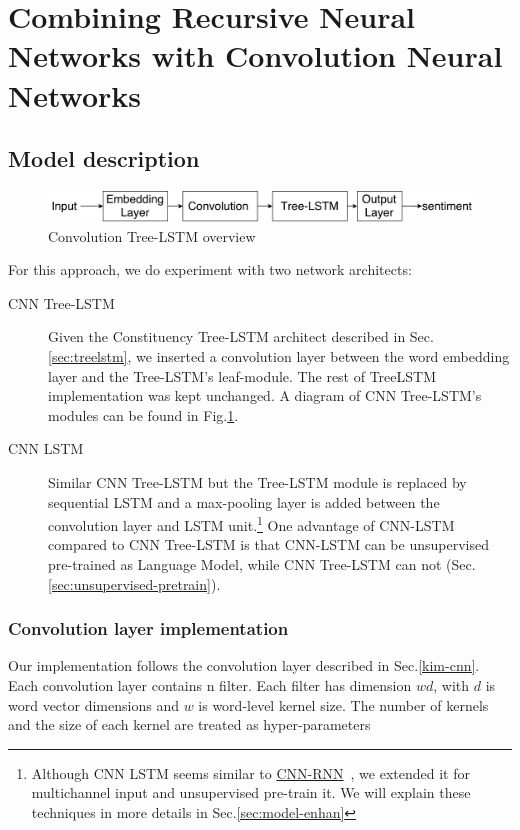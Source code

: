 \hypertarget{sec:CNNtree}{\section{Combining Recursive Neural Networks with Convolution Neural Networks}}\label{sec:CNNtree}
\subsection{Model description}
\begin{figure}[H]
    \centering
    \includegraphics[width=0.8\linewidth]{figure/convtreelstmsummary}
    \caption[Convolution Tree-LSTM overview]{Convolution Tree-LSTM overview}
    \label{fig:convtreelstmsummary}
\end{figure}
For this approach, we do experiment with two network architects:
\begin{description}
\item[CNN Tree-LSTM] Given the Constituency Tree-LSTM architect described in Sec.\ref{sec:treelstm},  we inserted a convolution layer between the word embedding layer and the Tree-LSTM's leaf-module.
The rest of TreeLSTM implementation was kept unchanged.
A diagram of CNN Tree-LSTM's modules can be found in Fig.\ref{fig:convtreelstmsummary}.
\item[CNN LSTM] Similar CNN Tree-LSTM but the Tree-LSTM module is replaced by sequential LSTM and a max-pooling layer is added between the convolution layer and LSTM unit.\footnote{Although CNN LSTM seems similar to \hyperref[cnn-rnn]{CNN-RNN}~\cite{cnn-rnn}, we extended it for multichannel input and unsupervised pre-train it. We will explain these techniques in more details in Sec.\ref{sec:model-enhan}}
One advantage of CNN-LSTM compared to CNN Tree-LSTM is that CNN-LSTM can be unsupervised pre-trained as Language Model, while CNN Tree-LSTM can not (Sec.\ref{sec:unsupervised-pretrain}).
\end{description}


\subsubsection{Convolution layer implementation} \label{sec:conv1c}
Our implementation follows the convolution layer described in Sec.\ref{kim-cnn}.
Each convolution layer contains n filter.
Each filter has dimension $wd$, with \(d\) is word vector dimensions and \(w\) is word-level kernel size.
The number of kernels and the size of each kernel are treated as hyper-parameters

